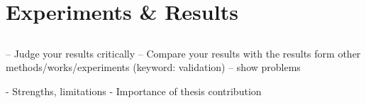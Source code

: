 \chapter{Experiments \& Results}
\label{chap:4}


\section{}
\bigskip






%

-- Judge your results critically
-- Compare your results with the results form other methods/works/experiments (keyword: validation)
-- show problems

- Strengths, limitations
- Importance of thesis contribution

